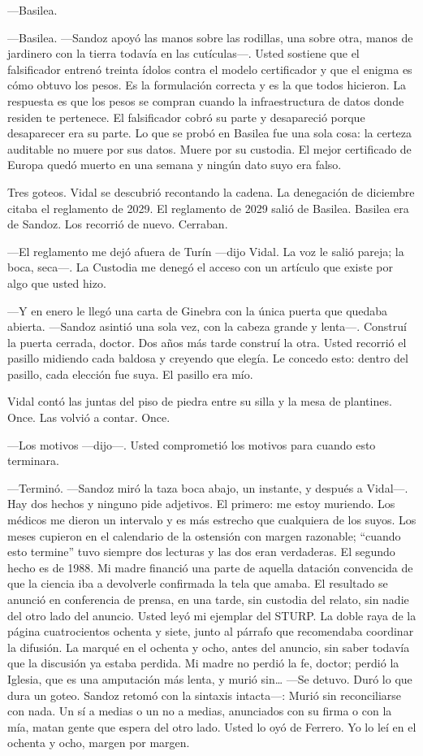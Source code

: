 ---Basilea.

---Basilea. ---Sandoz apoyó las manos sobre las rodillas, una sobre otra, manos de jardinero con la tierra todavía en las cutículas---. Usted sostiene que el falsificador entrenó treinta ídolos contra el modelo certificador y que el enigma es cómo obtuvo los pesos. Es la formulación correcta y es la que todos hicieron. La respuesta es que los pesos se compran cuando la infraestructura de datos donde residen te pertenece. El falsificador cobró su parte y desapareció porque desaparecer era su parte. Lo que se probó en Basilea fue una sola cosa: la certeza auditable no muere por sus datos. Muere por su custodia. El mejor certificado de Europa quedó muerto en una semana y ningún dato suyo era falso.

Tres goteos. Vidal se descubrió recontando la cadena. La denegación de diciembre citaba el reglamento de 2029. El reglamento de 2029 salió de Basilea. Basilea era de Sandoz. Los recorrió de nuevo. Cerraban.

---El reglamento me dejó afuera de Turín ---dijo Vidal. La voz le salió pareja; la boca, seca---. La Custodia me denegó el acceso con un artículo que existe por algo que usted hizo.

---Y en enero le llegó una carta de Ginebra con la única puerta que quedaba abierta. ---Sandoz asintió una sola vez, con la cabeza grande y lenta---. Construí la puerta cerrada, doctor. Dos años más tarde construí la otra. Usted recorrió el pasillo midiendo cada baldosa y creyendo que elegía. Le concedo esto: dentro del pasillo, cada elección fue suya. El pasillo era mío.

Vidal contó las juntas del piso de piedra entre su silla y la mesa de plantines. Once. Las volvió a contar. Once.

---Los motivos ---dijo---. Usted comprometió los motivos para cuando esto terminara.

---Terminó. ---Sandoz miró la taza boca abajo, un instante, y después a Vidal---. Hay dos hechos y ninguno pide adjetivos. El primero: me estoy muriendo. Los médicos me dieron un intervalo y es más estrecho que cualquiera de los suyos. Los meses cupieron en el calendario de la ostensión con margen razonable; ``cuando esto termine'' tuvo siempre dos lecturas y las dos eran verdaderas. El segundo hecho es de 1988. Mi madre financió una parte de aquella datación convencida de que la ciencia iba a devolverle confirmada la tela que amaba. El resultado se anunció en conferencia de prensa, en una tarde, sin custodia del relato, sin nadie del otro lado del anuncio. Usted leyó mi ejemplar del STURP. La doble raya de la página cuatrocientos ochenta y siete, junto al párrafo que recomendaba coordinar la difusión. La marqué en el ochenta y ocho, antes del anuncio, sin saber todavía que la discusión ya estaba perdida. Mi madre no perdió la fe, doctor; perdió la Iglesia, que es una amputación más lenta, y murió sin\ldots{} ---Se detuvo. Duró lo que dura un goteo. Sandoz retomó con la sintaxis intacta---: Murió sin reconciliarse con nada. Un sí a medias o un no a medias, anunciados con su firma o con la mía, matan gente que espera del otro lado. Usted lo oyó de Ferrero. Yo lo leí en el ochenta y ocho, margen por margen.

